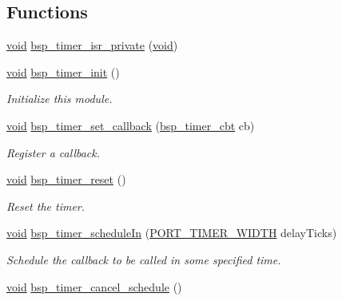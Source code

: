 \subsection*{Functions}
\begin{DoxyCompactItemize}
\item 
\hyperlink{usb__devapi_8h_afabf60e7f57651d6d595a02c75f07cd0}{void} \hyperlink{_open_mote-_c_c2538_2bsp__timer_8c_abbb2541f687b8d271219b3b33499d80a}{bsp\+\_\+timer\+\_\+isr\+\_\+private} (\hyperlink{usb__devapi_8h_afabf60e7f57651d6d595a02c75f07cd0}{void})
\item 
\hyperlink{usb__devapi_8h_afabf60e7f57651d6d595a02c75f07cd0}{void} \hyperlink{group__bsp__timer_gaffec2bf6372cf491a97821c19abad0fa}{bsp\+\_\+timer\+\_\+init} ()
\begin{DoxyCompactList}\small\item\em Initialize this module. \end{DoxyCompactList}\item 
\hyperlink{usb__devapi_8h_afabf60e7f57651d6d595a02c75f07cd0}{void} \hyperlink{group__bsp__timer_ga3a31a787657dccde5a1895fc87578589}{bsp\+\_\+timer\+\_\+set\+\_\+callback} (\hyperlink{openwsnmodule__obj_8h_a217f88f41d2d57897598ce4147c80419}{bsp\+\_\+timer\+\_\+cbt} cb)
\begin{DoxyCompactList}\small\item\em Register a callback. \end{DoxyCompactList}\item 
\hyperlink{usb__devapi_8h_afabf60e7f57651d6d595a02c75f07cd0}{void} \hyperlink{group__bsp__timer_ga797994251b8540f4be7628411cb98c73}{bsp\+\_\+timer\+\_\+reset} ()
\begin{DoxyCompactList}\small\item\em Reset the timer. \end{DoxyCompactList}\item 
\hyperlink{usb__devapi_8h_afabf60e7f57651d6d595a02c75f07cd0}{void} \hyperlink{group__bsp__timer_gac6b96b1c74c2fd8a4c307831d0fc7528}{bsp\+\_\+timer\+\_\+schedule\+In} (\hyperlink{z1_2board__info_8h_abe66b9c1c60db84f2a99f2b827275f24}{P\+O\+R\+T\+\_\+\+T\+I\+M\+E\+R\+\_\+\+W\+I\+D\+TH} delay\+Ticks)
\begin{DoxyCompactList}\small\item\em Schedule the callback to be called in some specified time. \end{DoxyCompactList}\item 
\hyperlink{usb__devapi_8h_afabf60e7f57651d6d595a02c75f07cd0}{void} \hyperlink{group__bsp__timer_ga46f9e9c7fb4f454fdc1febf216409ed6}{bsp\+\_\+timer\+\_\+cancel\+\_\+schedule} ()

\end{DoxyCompactItemize}
